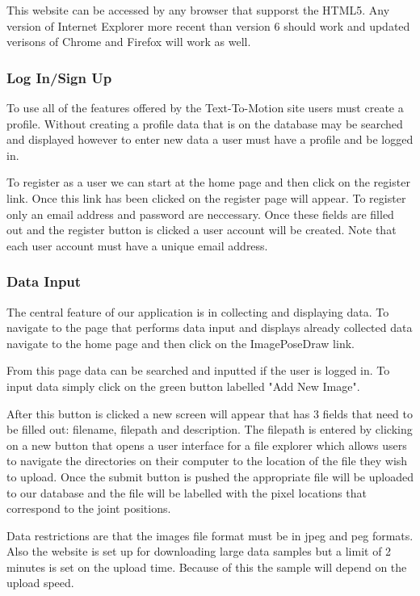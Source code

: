 \documentclass{scrreprt}
\begin{document}
This website can be accessed by any browser that supporst the HTML5.  Any version of Internet Explorer more recent than version 6 should work and updated verisons of Chrome and Firefox will work as well.

\subsubsection{Log In/Sign Up}
To use all of the features offered by the Text-To-Motion site users must create a profile.  Without creating a profile data that is on the database may be searched and displayed however to enter new data a user must have a profile and be logged in.

To register as a user we can start at the home page and then click on the register link.  Once this link has been clicked on the register page will appear.  To register only an email address and password are neccessary.  Once these fields are filled out and the register button is clicked a user account will be created.  Note that each user account must have a unique email address.

\subsubsection{Data Input}
The central feature of our application is in collecting and displaying data.  To navigate to the page that performs data input and displays already collected data navigate to the home page and then click on the ImagePoseDraw link. 

From this page data can be searched and inputted if the user is logged in.  To input data simply click on the green button labelled "Add New Image". 

After this button is clicked a new screen will appear that has 3 fields that need to be filled out: filename, filepath and description.  The filepath is entered by clicking on a new button that opens a user interface for a file explorer which allows users to navigate the directories on their computer to the location of the file they wish to upload.  Once the submit button is pushed the appropriate file will be uploaded to our database and the file will be labelled with the pixel locations that correspond to the joint positions.  

Data restrictions are that the images file format must be in jpeg and peg formats.  Also the website is set up for downloading large data samples but a limit of 2 minutes is set on the upload time.  Because of this the sample will depend on the upload speed.
\end{document}
